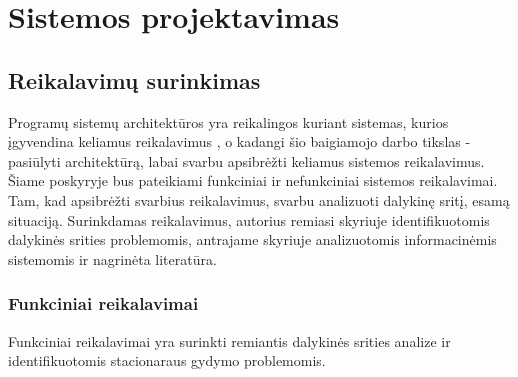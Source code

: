 

\section{Sistemos projektavimas}


\subsection{Reikalavimų surinkimas}
Programų sistemų architektūros yra reikalingos kuriant sistemas, kurios įgyvendina keliamus reikalavimus \cite{Bass2013}, o kadangi šio baigiamojo darbo tikslas - pasiūlyti architektūrą, labai svarbu apsibrėžti keliamus sistemos reikalavimus. Šiame poskyryje bus pateikiami funkciniai ir nefunkciniai sistemos reikalavimai. Tam, kad apsibrėžti svarbius reikalavimus, svarbu analizuoti dalykinę sritį, esamą situaciją. Surinkdamas reikalavimus, autorius remiasi skyriuje identifikuotomis dalykinės srities problemomis, antrajame skyriuje analizuotomis informacinėmis sistemomis ir nagrinėta literatūra.
\subsubsection{Funkciniai reikalavimai}

Funkciniai reikalavimai yra surinkti remiantis dalykinės srities analize ir identifikuotomis stacionaraus gydymo problemomis.

